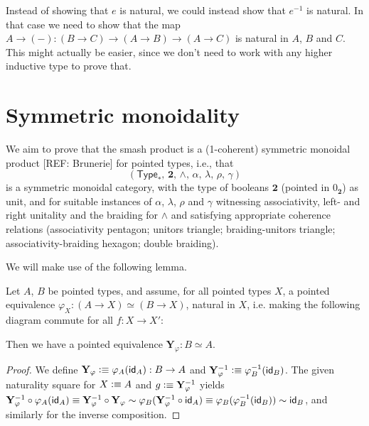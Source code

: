 \documentclass{article}
\renewcommand{\smash}{\wedge}
\renewcommand{\phi}{\varphi}
\renewcommand{\o}{\ensuremath{\circ}}
\newcommand{\sy}{^{-1}}
\newcommand{\pType}{\mathsf{Type}_\ast}
\newcommand{\two}{\mathbf{2}}
\newcommand{\yoneda}{\mathbf{Y}}
\begin{document}
\begin{rmk}
  Instead of showing that $e$ is natural, we could instead show that $e^{-1}$ is natural. In
  that case we need to show that the map $A\to({-}):(B\to C)\to(A\to B)\to(A\to C)$ is natural in
  $A$, $B$ and $C$. This might actually be easier, since we don't need to work with any higher
  inductive type to prove that.
\end{rmk}

\section{Symmetric monoidality}
We aim to prove that the smash product is a (1-coherent) symmetric monoidal product [REF: Brunerie] for pointed types, i.e., that
\[(\pType,\, \two,\, \smash,\, \alpha,\, \lambda,\, \rho,\, \gamma)\]
is a symmetric monoidal category, with the type of booleans $\two$ (pointed in $0_\two$) as unit, and for suitable instances of $\alpha$, $\lambda$, $\rho$ and $\gamma$ witnessing associativity, left- and right unitality and the braiding for $\smash$ and satisfying appropriate coherence relations (associativity pentagon; unitors triangle; braiding-unitors triangle; associativity-braiding hexagon; double braiding).

We will make use of the following lemma.
\begin{lem}[Yoneda]\label{lem:yoneda}
Let $A$, $B$ be pointed types, and assume, for all pointed types $X$, a pointed equivalence $\phi_X : (A \to X) \simeq (B \to X)$, natural in $X$, i.e. making the following diagram commute for all $f : X \to X'$:
\begin{center}
\end{center}
Then we have a pointed equivalence $\yoneda_\phi : B \simeq A$.
\end{lem}
\begin{proof}
We define $\yoneda_\phi \defeq \phi_A(\idfunc[A]) : B \to A$ and $\yoneda_\phi\sy \defeq \phi_B\sy(\idfunc[B])$. The given naturality square for $X \vcentcolon\equiv A$ and $g \defeq \yoneda_\phi\sy$ yields $\yoneda_\phi\sy \o \phi_A (\idfunc[A]) \judgeq \yoneda_\phi\sy \o \yoneda_\phi \sim \phi_B (\yoneda_\phi\sy \o \idfunc[A]) \judgeq \phi_B (\phi_B\sy (\idfunc[B])) \sim \idfunc[B]$, and similarly for the inverse composition.
\end{proof}
\end{document}
